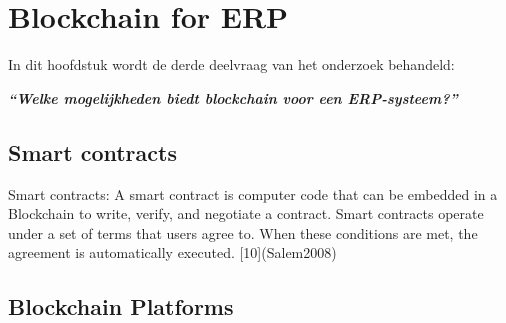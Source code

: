\chapter{Blockchain for ERP}
\label{ch:blockchain-for-erp}

In dit hoofdstuk wordt de derde deelvraag van het onderzoek behandeld:

\begin{center}
	\textit{\textbf{``Welke mogelijkheden biedt blockchain voor een ERP-systeem?''}}
\end{center}

\section{Smart contracts}
Smart contracts:
A smart contract is computer code that can 
be embedded in a Blockchain to write, 
verify, and negotiate a contract. Smart 
contracts operate under a set of terms that 
users agree to. When these conditions are 
met, the agreement is automatically 
executed. [10](Salem2008)

\section{Blockchain Platforms}